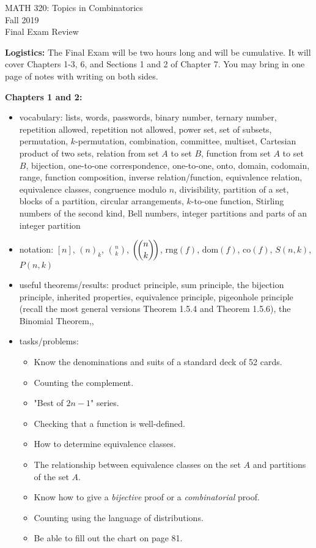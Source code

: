 \documentclass[11pt]{article}
\newcommand{\textmultiset}[2]{\bigl(\!{\binom{#1}{#2}}\!\bigr)}
\newcommand{\displaymultiset}[2]{\left(\!{\binom{#1}{#2}}\!\right)}
\newcommand\multiset[2]{\mathchoice{\displaymultiset{#1}{#2}}
                                {\textmultiset{#1}{#2}}
                                {\textmultiset{#1}{#2}}
                                {\textmultiset{#1}{#2}}}
\begin{document}
\begin{center}MATH 320: Topics in Combinatorics  \\ Fall 2019 \\ Final Exam Review\end{center}

\hrulefill

\noindent\textbf{Logistics:} The Final Exam will be two hours long and will be cumulative. It will cover Chapters 1-3, 6, and Sections 1 and 2 of Chapter 7. You may bring in one page of notes with writing on both sides. \\

\hrulefill

\noindent\textbf{Chapters 1 and 2:} 

\begin{itemize}
\item vocabulary: lists, words, passwords, binary number, ternary number, repetition allowed, repetition not allowed, power set, set of subsets, permutation, $k$-permutation, combination, committee, multiset, Cartesian product of two sets, relation from set $A$ to set $B$, function from set $A$ to set $B$, bijection, one-to-one correspondence, one-to-one, onto, domain, codomain, range, function composition, inverse relation/function, equivalence relation, equivalence classes, congruence modulo $n$, divisibility, partition of a set, blocks of a partition, circular arrangements, $k$-to-one function, Stirling numbers of the second kind, Bell numbers,  integer partitions and parts of an integer partition

\item notation: $[n]$, $(n)_k$, $\displaystyle{n \choose k}$, $\displaystyle{\multiset{n}{k}}$, $\text{rng}(f)$, $\text{dom}(f)$, $\text{co}(f)$, $S(n,k)$, $P(n,k)$

\item useful theorems/results: product principle, sum principle, the bijection principle, inherited properties, equivalence principle, pigeonhole principle (recall the most general versions Theorem 1.5.4 and Theorem 1.5.6), the Binomial Theorem,,

\item tasks/problems:
	\begin{itemize}
	\item Know the denominations and suits of a standard deck of 52 cards.
	\item Counting the complement.
	\item "Best of $2n-1$" series.
	\item Checking that a function is well-defined.
	\item How to determine equivalence classes.
	\item The relationship between equivalence classes on the set $A$ and partitions of the set $A.$
	\item Know how to give a \emph{bijective} proof or a \emph{combinatorial} proof.
	\item Counting using the language of distributions.
	\item Be able to fill out the chart on page 81.
	\end{itemize}


\end{itemize}
\end{document}
